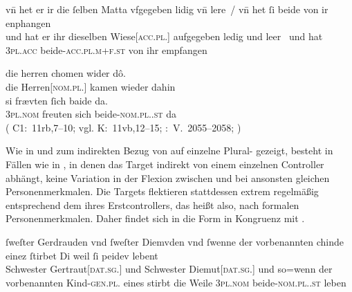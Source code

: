 \begin{exe}
\ex \label{ex:pronindir}
	\begin{xlist}
	\ex \label{ex:pronindir_1}
		\gll vn̄ het er ir {die ſelben} Matta vfgegeben lidig vn̄ lere~/
			vn̄ het ſi beide von ir enphangen \\
		und hat er ihr dieselben Wiese[\textsc{acc.pl.\FemI}] aufgegeben ledig
			und leer~{} und hat \textsc{3pl\subI.acc}
			beide-\textsc{acc.pl.m+f\subI.st} von ihr empfangen \\
		\trans {}
			\parencites(Nr.~2733, Freiburg i.\,Br., 1297)[105,23--24]{cao4}

	\ex \label{ex:pronindir_2}
		\gll die herren chomen wider dô. \\
			die Herren[\textsc{nom.pl.\MascM}] kamen wieder dahin \\
			\textelp{}
	\sn \gll si frævten ſich baide da. \\
			\textsc{3pl\subM.nom} freuten sich beide-\textsc{nom.pl.\MascM.st}
			da \\
		\trans {}
			(%
				C1:~11rb,7--10; vgl.
				K:~11vb,12--15;
				\KC:~V.~2055--2058;
				\cite[119]{schroeder1895}%
			)
	\end{xlist}
\end{exe}

Wie in  und
 zum indirekten Bezug von  auf
einzelne Plural- gezeigt, besteht in Fällen wie in
, in denen das Target indirekt von einem einzelnen Controller
abhängt, keine Variation in der Flexion zwischen  und 
bei ansonsten gleichen Personenmerkmalen. Die Targets
flektieren stattdessen extrem regelmäßig entsprechend dem  ihres
Erstcontrollers, das heißt also, nach formalen
Personenmerkmalen. Daher findet sich in
 die Form   in Kongruenz mit
 .

\begin{exe}
\ex \label{ex:f+f_kindesibeidiu}
	\gll ſweſter Gerdrauden vnd ſweſter Diemvden
			\textelp{} vnd ſwenne der vorbenannten chinde einez ſtirbet
			\textelp{} Di weil ſi peidev lebent \\
		Schwester Gertraut[\textsc{dat.sg.\FemF}] und Schwester
			Diemut[\textsc{dat.sg.\FemF}]
			{} und so=wenn der vorbenannten
			Kind-\textsc{gen.pl.\NeutF} eines stirbt {} die Weile
			\textsc{3pl\subF.nom} beide-\textsc{nom.pl.\NeutF.st} leben \\
	\trans {}
		\parencites(Nr.~2960, Engelthal, Kr.~Nürnberger Land, 1298)[240,31--38]{cao4}
\end{exe}

